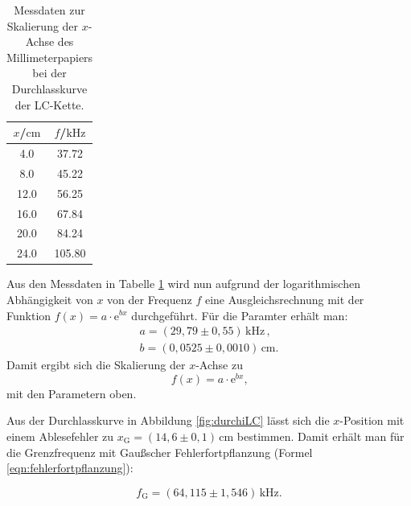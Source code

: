 \begin{table}
	\caption{Messdaten zur Skalierung der $x$-Achse des Millimeterpapiers bei der
	Durchlasskurve der LC-Kette.}
	\label{tab:skalaLC}
	\centering
	\begin{tabular}{cc}
		\toprule
		$x$/$\si{\centi\meter}$ & $f$/$\si{\kilo\hertz}$ \\
		\midrule
		4.0                     & 37.72                  \\
		8.0                     & 45.22                  \\
		12.0                    & 56.25                  \\
		16.0                    & 67.84                  \\
		20.0                    & 84.24                  \\
		24.0                    & 105.80                 \\
		\bottomrule
	\end{tabular}
\end{table}
Aus den Messdaten in Tabelle \ref{tab:skalaLC} wird nun aufgrund der logarithmischen
Abhängigkeit von $x$ von der Frequenz $f$ eine Ausgleichsrechnung mit der Funktion
$f(x) = a \cdot \mathrm{e}^{bx}$ durchgeführt.
Für die Paramter erhält man:
\begin{gather*}
	a = (29,79 \pm 0,55) \, \si{\kilo\hertz} \, \text{,}  \\
	b = (0,0525 \pm 0,0010) \, \si{\centi\meter} \text{.}
\end{gather*}
Damit ergibt sich die Skalierung der $x$-Achse zu
\begin{equation}
	f(x) = a \cdot \mathrm{e}^{bx} \text{,}
\end{equation}
mit den Parametern oben.

Aus der Durchlasskurve in Abbildung \ref{fig:durchiLC} lässt sich die $x$-Position mit einem
Ablesefehler zu $x_{\text{G}} = (14,6 \pm 0,1) \, \si{\centi\meter}$ bestimmen.
Damit erhält man für die Grenzfrequenz mit Gaußscher Fehlerfortpflanzung (Formel
\eqref{eqn:fehlerfortpflanzung}):





\begin{equation*}
	f_{\text{G}} = (64,115 \pm 1,546 ) \, \si{\kilo\hertz} \text{.}
\end{equation*}



